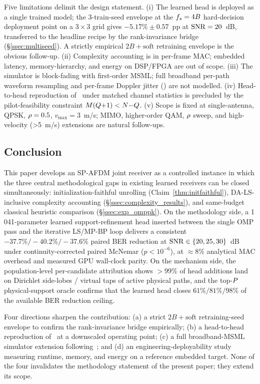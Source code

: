 Five limitations delimit the design statement. (i) The learned head is
deployed as a single trained model; the 3-train-seed envelope at
the $f_s=4B$ hard-decision deployment point on a $3{\times}3$ grid gives
$-5.17\%\pm 0.57$~pp at $\mathrm{SNR}=20$~dB, transferred to the headline
recipe by the rank-invariance bridge (\S\ref{ssec:multiseed}). A
strictly empirical $2B+\text{soft}$ retraining envelope is the obvious
follow-up. (ii) Complexity accounting is in per-frame MAC; embedded
latency, memory-hierarchy, and energy on DSP/FPGA are out of scope.
(iii) The simulator is block-fading with first-order MSML; full
broadband per-path waveform resampling and per-frame Doppler jitter
(\cite{zhou2024msmlafdm}) are not modelled. (iv) Head-to-head reproduction
of~\cite{qing2024spafdm} under matched channel statistics is precluded by
the pilot-feasibility constraint $M(Q{+}1)<N{-}Q$.
(v) Scope is fixed at single-antenna, QPSK, $\rho=0.5$,
$v_{\max}=3$~m/s; MIMO, higher-order QAM, $\rho$ sweep, and
high-velocity (>5~m/s) extensions are natural follow-ups.

\subsection{Conclusion}
\label{sec:conclusion}

This paper develops an SP-AFDM joint receiver as a controlled instance
in which the three central methodological gaps in existing
learned receivers can be closed simultaneously: initialization-faithful
unrolling (Claim~\ref{thm:initfaithful}), DA-LS-inclusive
complexity accounting (\S\ref{ssec:complexity_results}), and same-budget
classical heuristic comparison (\S\ref{ssec:exp_omppk}). On the
methodology side, a 1\,041-parameter learned support-refinement head
inserted between the single OMP pass and the iterative LS/MP-BP loop
delivers a consistent $-37.7\%/-40.2\%/-37.6\%$ paired BER reduction
at $\mathrm{SNR}\in\{20,25,30\}$~dB under continuity-corrected paired McNemar
($p<10^{-6}$), at $\approx 8\%$ analytical MAC overhead and measured GPU
wall-clock parity. On the mechanism side, the population-level
per-candidate attribution shows $>99\%$ of head additions land on
Dirichlet side-lobes / virtual taps of active physical paths, and the
top-$P$ physical-support oracle confirms that the learned head
closes $61\%/81\%/98\%$ of the available BER reduction ceiling.

Four directions sharpen the contribution: (a) a strict
$2B+\text{soft}$ retraining-seed envelope to confirm the rank-invariance
bridge empirically; (b) a head-to-head reproduction of~\cite{qing2024spafdm}
at a downscaled operating point; (c) a full broadband-MSML simulator
extension following~\cite{zhou2024msmlafdm}; and (d) an
engineering-deployability study measuring runtime, memory, and energy
on a reference embedded target. None of the four invalidates the
methodology statement of the present paper; they extend its scope.
